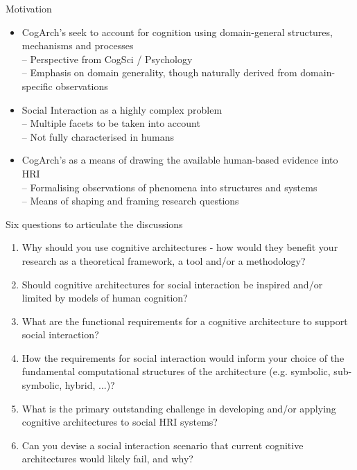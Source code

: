 \documentclass[compress]{beamer}
\begin{document}
\begin{frame}{Motivation}

	\begin{itemize}
	
	\item<1-> CogArch's seek to account for cognition using domain-general structures, mechanisms and processes \\ {\footnotesize -- Perspective from CogSci / Psychology \\-- Emphasis on domain generality, though naturally derived from domain-specific observations}
	
	\item<2-> Social Interaction as a highly complex problem \\ {\footnotesize -- Multiple facets to be taken into account \\-- Not fully characterised in humans}
	
	\item<3-> CogArch's as a means of drawing the available human-based evidence into HRI \\ {\footnotesize -- Formalising observations of phenomena into structures and systems \\-- Means of shaping and framing research questions}
	
	\end{itemize}

\end{frame}


\begin{frame}{Six questions to articulate the discussions}

    \begin{enumerate}

\item<1-> Why should you use cognitive architectures - how would they benefit your
    research as a theoretical framework, a tool and/or a methodology?

\item<2-> Should cognitive architectures for social interaction be inspired and/or
    limited by models of human cognition?

\item<3-> What are the functional requirements for a cognitive architecture to
    support social interaction?

\item<4-> How the requirements for social interaction would inform your choice of
    the fundamental computational structures of the architecture (e.g. symbolic,
    sub-symbolic, hybrid, ...)?

\item<5-> What is the primary outstanding challenge in developing and/or applying
    cognitive architectures to social HRI systems?

\item<6-> Can you devise a social interaction scenario that current cognitive
    architectures would likely fail, and why?

    \end{enumerate}
\end{frame}
\end{document}
